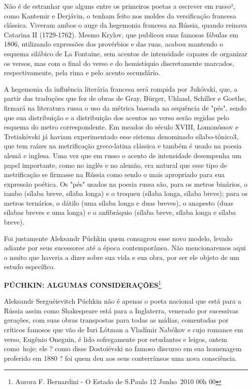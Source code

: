 Não é de estranhar que alguns entre os primeiros poetas a escrever em
rus­so², como Kantemir e Derjávin, o tenham feito nos moldes da
versificação fran­cesa clássica. Viveram ambos o auge da hegemonia
francesa na Rússia, quando reinava Catarina II (1729-1762). Mesmo
Krylov, que publicou suas famosas fábulas em 1806, utilizando expressões
dos provérbios e das ruas, acabou man­tendo o esquema silábico de La
Fontaine, sem acentos de intensidade capazes de organizar os versos, mas
com o final do verso e do hemistíquio discreta­mente marcados,
respectivamente, pela rima e pelo acento secundário.

A hegemonia da influência literária francesa será rompida por Jukóvski,
que, a partir das traduções que fez de obras de Gray, Bürger, Uhland,
Schiller e Goethe, firmará na literatura russa o uso da métrica baseada
na sequência de "pés", sendo que sua distribuição e a distribuição dos
acentos no verso serão regidas pelo esquema do metro correspondente. Em
meados do século XVIII, Lomonóssov e Tretiakóvski já haviam
experimentado esse sistema denomina­do sílabo-tônico3, que tem raízes na
metrificação greco-latina clássica e tam­bém é usado na poesia alemã e
inglesa. Uma vez que em russo o acento de intensidade desempenha um
papel importante, como no inglês e no alemão, era natural que esse tipo
de metrificação se firmasse na Rússia como sendo o mais apropriado para
sua expressão poética. Os "pés" usados na poesia russa são, para os
metros binários, o iambo (sílaba breve, sílaba longa) e o troqueu
(sílaba longa, sílaba breve); para os metros ternários, o dátilo (uma
sílaba lon­ga e duas breves), o anapesto (duas sílabas breves e uma
longa) e o anfibráquio (sílaba breve, sílaba longa e sílaba breve).

Foi justamente Aleksandr Púchkin quem consagrou esse novo modelo, levado
adiante por seus sucessores até a época contemporânea. Não mencionaremos
aqui o muito que haveria a dizer sobre sua vida e sua obra, por ser ele
objeto de um estudo específico.

\textbf{PÚCHKIN: ALGUMAS CONSIDERAÇÕES}\footnote{Aurora F. Bernardini -
  O Estado de S.Paulo 12 Junho~2010 \textbar{} 00h 00}

Aleksandr Serguéievitch Púchkin não é apenas o poeta nacional que está
para a Rússia assim como Shakespeare está para a Inglaterra, venerado
por sucessivas gerações, com suas obras transpostas para todas as
mídias, comentadas por críticos famosos que vão de Iuri Lótman a
Vladímir Nabókov e cujo romance em verso, Eugênio Oneguin, é lido
sofregamente por estudantes e leigos, ontem como~hoje; ele ? como disse
Dostoiévski no famoso discurso em sua homenagem proferido em 1880 ? foi
quem deu aos seus conterrâneos uma nova consciência.

